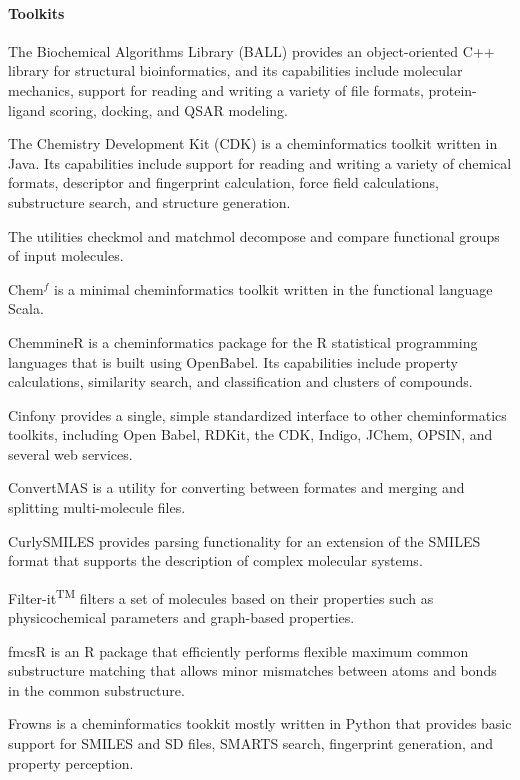 \paragraph{Toolkits}
The Biochemical Algorithms Library (BALL) \cite{Hildebrandt_2010} provides an object-oriented C++ library for structural bioinformatics, and its capabilities include molecular mechanics, support for reading and writing a variety of file formats, protein-ligand scoring, docking, and QSAR modeling.

The Chemistry Development Kit (CDK) \cite{Steinbeck_2006} is a cheminformatics toolkit written in Java.  Its capabilities include support for reading and writing a variety of chemical formats, descriptor and fingerprint calculation, force field calculations, substructure search, and structure generation.

The utilities checkmol and matchmol \cite{Haider_2010} decompose and compare functional groups of input molecules.

Chem$^f$ \cite{H_ck_2012} is a minimal cheminformatics toolkit written in the functional language Scala.

ChemmineR \cite{Cao_2008}  is a cheminformatics package for the R statistical programming languages that is built using OpenBabel. Its capabilities include property calculations, similarity search, and classification and clusters of compounds.

Cinfony \cite{cinfony} provides a single, simple standardized interface to other cheminformatics toolkits, including Open Babel, RDKit, the CDK, Indigo, JChem, OPSIN, and several web services.

ConvertMAS is a utility for converting between formates and merging and splitting multi-molecule files.

CurlySMILES \cite{Drefahl_2011} provides parsing functionality for an extension of the SMILES format that supports the description of complex molecular systems.

Filter-it\textsuperscript{TM} filters a set of molecules based on their properties such as physicochemical parameters and graph-based properties. 

fmcsR \cite{Goecks_2010} is an R package that efficiently performs flexible maximum common substructure matching that allows minor mismatches between atoms and bonds in the common substructure.

Frowns is a cheminformatics tookkit mostly written in Python that provides basic support for SMILES and SD files, SMARTS search, fingerprint generation, and property perception.

